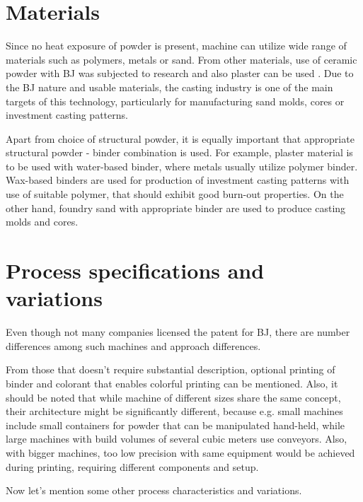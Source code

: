 \documentclass[a4paper, twoside, 11pt]{report}
\begin{document}
\section{Materials}
Since no heat exposure of powder is present, machine can utilize wide range of materials such as polymers, metals or sand. From other materials, use of ceramic powder with BJ was subjected to research and also plaster can be used \cite[p. 208]{AMT} \cite{ZCorp}. Due to the BJ nature and usable materials, the casting industry is one of the main targets of this technology, particularly for manufacturing sand molds, cores or investment casting patterns.
	
	Apart from choice of structural powder, it is equally important that appropriate structural powder - binder combination is used. For example, plaster material is to be used with water-based binder, where metals usually utilize polymer binder. Wax-based binders are used for production of investment casting patterns with use of suitable polymer, that should exhibit good burn-out properties. On the other hand, foundry sand with appropriate binder are used to produce casting molds and cores.

\section{Process specifications and variations}
Even though not many companies licensed the patent for BJ, there are number differences among such machines and approach differences.

	From those that doesn't require substantial description, optional printing of binder and colorant that enables colorful printing can be mentioned. Also, it should be noted that while machine of different sizes share the same concept, their architecture might be significantly different, because e.g. small machines include small containers for powder that can be manipulated hand-held, while large machines with build volumes of several cubic meters use conveyors. Also, with bigger machines, too low precision with same equipment would be achieved during printing, requiring different components and setup.
	
	Now let's mention some other process characteristics and variations.	
\end{document}
